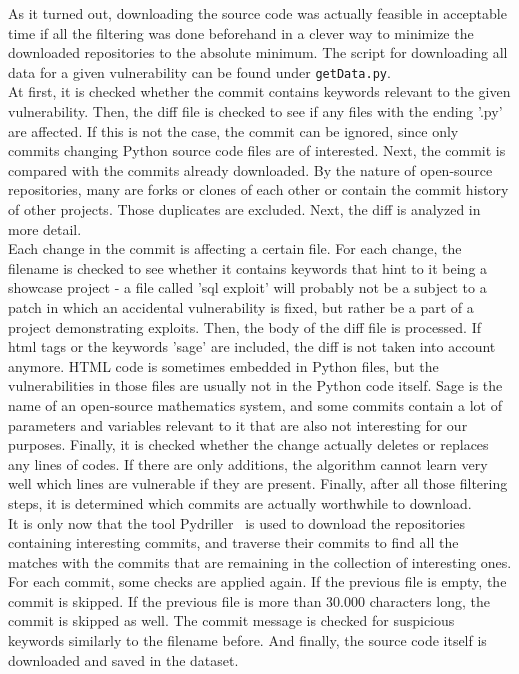 \documentclass[
a4paper,
pagesize,
pdftex,
12pt,
twoside, %
BCOR=5mm, %
ngerman,
fleqn,
final,
]{scrartcl}
\begin{document}
	As it turned out, downloading the source code was actually feasible in acceptable time if all the filtering was done beforehand in a clever way to minimize the downloaded repositories to the absolute minimum. The script for downloading all data for a given vulnerability can be found under \texttt{getData.py}.\\
	At first, it is checked whether the commit contains keywords relevant to the given vulnerability. Then, the diff file is checked to see if any files with the ending '.py' are affected. If this is not the case, the commit can be ignored, since only commits changing Python source code files are of interested. Next, the commit is compared with the commits already downloaded. By the nature of open-source repositories, many are forks or clones of each other or contain the commit history of other projects. Those duplicates are excluded. Next, the diff is analyzed in more detail.\\
	Each change in the commit is affecting a certain file. For each change, the filename is checked to see whether it contains keywords that hint to it being a showcase project - a file called 'sql exploit' will probably not be a subject to a patch in which an accidental vulnerability is fixed, but rather be a part of a project demonstrating exploits. Then, the body of the diff file is processed. If html tags or the keywords 'sage' are included, the diff is not taken into account anymore. HTML code is sometimes embedded in Python files, but the vulnerabilities in those files are usually not in the Python code itself. Sage is the name of an open-source mathematics system, and some commits contain a lot of parameters and variables relevant to it that are also not interesting for our purposes. Finally, it is checked whether the change actually deletes or replaces any lines of codes. If there are only additions, the algorithm cannot learn very well which lines are vulnerable if they are present. Finally, after all those filtering steps, it is determined which commits are actually worthwhile to download.\\
	It is only now that the tool Pydriller~\cite{Spadini.2018} is used to download the repositories containing interesting commits, and traverse their commits to find all the matches with the commits that are remaining in the collection of interesting ones. For each commit, some checks are applied again. If the previous file is empty, the commit is skipped. If the previous file is more than 30.000 characters long, the commit is skipped as well. The commit message is checked for suspicious keywords similarly to the filename before. And finally, the source code itself is downloaded and saved in the dataset. 
	
\end{document}
